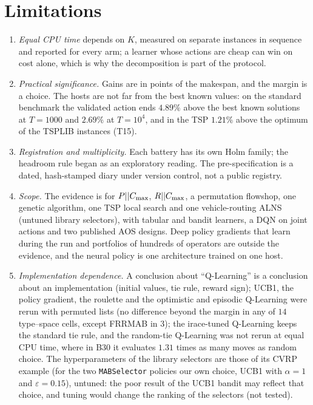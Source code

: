 \section{Limitations}
\label{sec:limitations}
\begin{enumerate}[label=(\roman*)]
\item \emph{Equal CPU time} depends on $K$, measured on separate instances in sequence and reported for every arm; a learner whose actions are cheap can win on cost alone, which is why the decomposition is part of the protocol.
\item \emph{Practical significance.} Gains are in points of the makespan, and the margin is a choice. The hosts are not far from the best known values: on the standard benchmark the validated action ends $4.89\%$ above the best known solutions at $T=1000$ and $2.69\%$ at $T=10^4$, and in the TSP $1.21\%$ above the optimum of the TSPLIB instances (T15).
\item \emph{Registration and multiplicity.} Each battery has its own Holm family; the headroom rule began as an exploratory reading. The pre-specification is a dated, hash-stamped diary under version control, not a public registry.
\item \emph{Scope.} The evidence is for $P||C_{\max}$, $R||C_{\max}$, a permutation flowshop, one genetic algorithm, one TSP local search and one vehicle-routing ALNS (untuned library selectors), with tabular and bandit learners, a DQN on joint actions and two published AOS designs. Deep policy gradients that learn during the run and portfolios of hundreds of operators are outside the evidence, and the neural policy is one architecture trained on one host.
\item \emph{Implementation dependence.} A conclusion about ``Q-Learning'' is a conclusion about an implementation (initial values, tie rule, reward sign); UCB1, the policy gradient, the roulette and the optimistic and episodic Q-Learning were rerun with permuted lists (no difference beyond the margin in any of $14$ type--space cells, except FRRMAB in $3$); the irace-tuned Q-Learning keeps the standard tie rule, and the random-tie Q-Learning was not rerun at equal CPU time, where in B30 it evaluates $1.31$ times as many moves as random choice. The hyperparameters of the library selectors are those of its CVRP example (for the two \texttt{MABSelector} policies our own choice, UCB1 with $\alpha=1$ and $\varepsilon=0.15$), untuned: the poor result of the UCB1 bandit may reflect that choice, and tuning would change the ranking of the selectors (not tested).

\end{enumerate}

